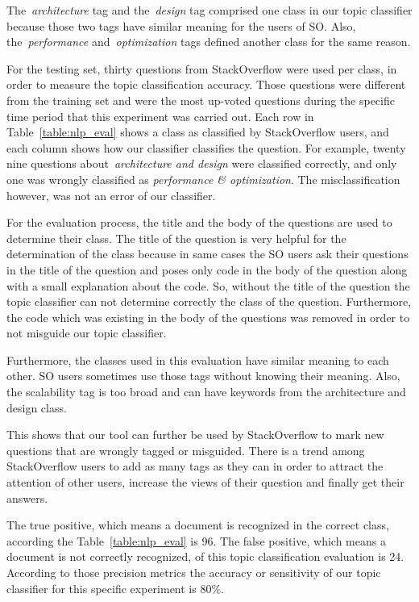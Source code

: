 The~\emph{architecture} tag and the~\emph{design} tag comprised one class in our topic classifier because those two tags have similar meaning for the users of SO. Also, the~\emph{performance} and~\emph{optimization} tags defined another class for the same reason.

For the testing set, thirty questions from StackOverflow were used per class, in order to measure the topic classification accuracy. Those questions were different from the training set and were the most up-voted questions during the specific time period that this experiment was carried out. Each row in Table~\ref{table:nlp_eval} shows a class as classified by StackOverflow users, and each column shows how our classifier classifies the question. For example, twenty nine questions about~\emph{architecture and design} were classified correctly, and only one was wrongly classified as \emph{performance \& optimization}. The misclassification however, was not an error of our classifier. 

For the evaluation process, the title and the body of the questions are used to determine their class. The title of the question is very helpful for the determination of the class because in same cases the SO users ask their questions in the title of the question and poses only code in the body of the question along with a small explanation about the code. So, without the title of the question the topic classifier can not determine correctly the class of the question. Furthermore, the code which was existing in the body of the questions was removed in order to not misguide our topic classifier.

Furthermore, the classes used in this evaluation have similar meaning to each other. SO users sometimes use those tags without knowing their meaning. Also, the scalability tag is too broad and can have keywords from the architecture and design class.

This shows that our tool can further be used by StackOverflow to mark new questions that are wrongly tagged or misguided. There is a trend among StackOverflow users to add as many tags as they can in order to attract the attention of other users, increase the views of their question and finally get their answers.  

The true positive, which means a document is recognized in the correct class, according the Table~\ref{table:nlp_eval} is 96. The false positive, which means a document is not correctly recognized, of this topic classification evaluation is 24. According to those precision metrics the accuracy or sensitivity of our topic classifier for this specific experiment is 80\%.

